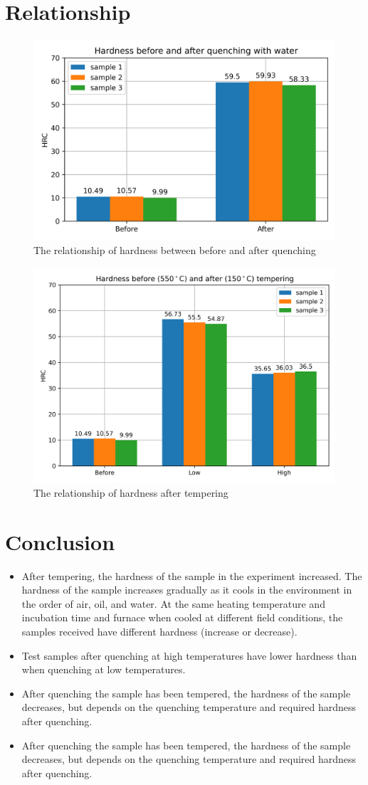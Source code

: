 \section{Relationship}
\begin{figure}[ht]
	\centering
	\includegraphics[width=0.5\linewidth]{Hardness.png}
	\caption{The relationship of hardness between before and after quenching}
\end{figure}
\begin{figure}[ht]
	\centering
	\includegraphics[width=0.5\linewidth]{Hardness2.png}
	\caption{The relationship of hardness after tempering}
	\label{label}
\end{figure}
\section{Conclusion}
\begin{itemize}
	\item After tempering, the hardness of the sample in the experiment increased. The hardness of the sample increases gradually as it cools in the environment in the order of air, oil, and water. At the same heating temperature and incubation time and furnace when cooled at different field conditions, the samples received have different hardness (increase or decrease).
	\item Test samples after quenching at high temperatures have lower hardness than when quenching at low temperatures.
	\item After quenching the sample has been tempered, the hardness of the sample decreases, but depends on the quenching temperature and required hardness after quenching.
	\item After quenching the sample has been tempered, the hardness of the sample decreases, but depends on the quenching temperature and required hardness after quenching.
\end{itemize}